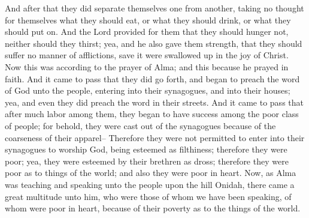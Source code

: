 And after that they did separate themselves one from another, taking no thought for themselves what they should eat, or what they should drink, or what they should put on.
\bverse \iffalse And the Lord provided for them that they should hunger not, neither should they thirst; yea, and he also gave them strength, that they should suffer no manner of afflictions, save it were swallowed up in the joy of Christ. Now this was according to the prayer of Alma; and this because he prayed in faith. \fi
And the Lord provided for them that they should hunger not, neither should they thirst; yea, and he also gave them strength, that they should suffer no manner of afflictions, save it were swallowed up in the joy of Christ. Now this was according to the prayer of Alma; and this because he prayed in faith.
\bchapter
\bverse \iffalse And it came to pass that they did go forth, and began to preach the word of God unto the people, entering into their synagogues, and into their houses; yea, and even they did preach the word in their streets. \fi
And it came to pass that they did go forth, and began to preach the word of God unto the people, entering into their synagogues, and into their houses; yea, and even they did preach the word in their streets.
\bverse \iffalse And it came to pass that after much labor among them, they began to have success among the poor class of people; for behold, they were cast out of the synagogues because of the coarseness of their apparel-- \fi
And it came to pass that after much labor among them, they began to have success among the poor class of people; for behold, they were cast out of the synagogues because of the coarseness of their apparel--
\bverse \iffalse Therefore they were not permitted to enter into their synagogues to worship God, being esteemed as filthiness; therefore they were poor; yea, they were esteemed by their brethren as dross; therefore they were poor as to things of the world; and also they were poor in heart. \fi
Therefore they were not permitted to enter into their synagogues to worship God, being esteemed as filthiness; therefore they were poor; yea, they were esteemed by their brethren as dross; therefore they were poor as to things of the world; and also they were poor in heart.
\bverse \iffalse Now, as Alma was teaching and speaking unto the people upon the hill Onidah, there came a great multitude unto him, who were those of whom we have been speaking, of whom were poor in heart, because of their poverty as to the things of the world. \fi
Now, as Alma was teaching and speaking unto the people upon the hill Onidah, there came a great multitude unto him, who were those of whom we have been speaking, of whom were poor in heart, because of their poverty as to the things of the world.
